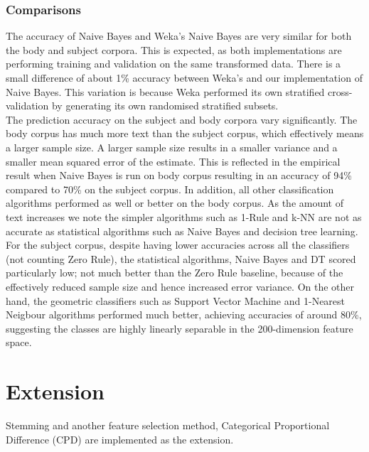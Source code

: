 \documentclass[12pt]{article}
\begin{document}
\subsubsection{Comparisons}
The accuracy of Naive Bayes and Weka's Naive Bayes are very similar for both the body and subject corpora. This is expected, as both implementations are performing training and validation on the same transformed data. There is a small difference of about 1\% accuracy between Weka's and our implementation of Naive Bayes. This variation is because Weka performed its own stratified cross-validation by generating its own randomised stratified subsets.\\

The prediction accuracy on the subject and body corpora vary significantly. The body corpus has much more text than the subject corpus, which effectively means a larger sample size. A larger sample size results in a smaller variance and a smaller mean squared error of the estimate. This is reflected in the empirical result when Naive Bayes is run on body corpus resulting in an accuracy of 94\% compared to 70\% on the subject corpus. In addition, all other classification algorithms performed as well or better on the body corpus. As the amount of text increases we note the simpler algorithms such as 1-Rule and k-NN are not as accurate as statistical algorithms such as Naive Bayes and decision tree learning. \\

For the subject corpus, despite having lower accuracies across all the classifiers (not counting Zero Rule), the statistical algorithms, Naive Bayes and DT scored particularly low; not much better than the Zero Rule baseline, because of the effectively reduced sample size and hence increased error variance. On the other hand, the geometric classifiers such as Support Vector Machine and 1-Nearest Neigbour algorithms performed much better, achieving accuracies of around 80\%, suggesting the classes are highly linearly separable in the 200-dimension feature space. \\
\section{Extension}
Stemming and another feature selection method, Categorical Proportional Difference (CPD) are implemented as the extension. 
\end{document}
